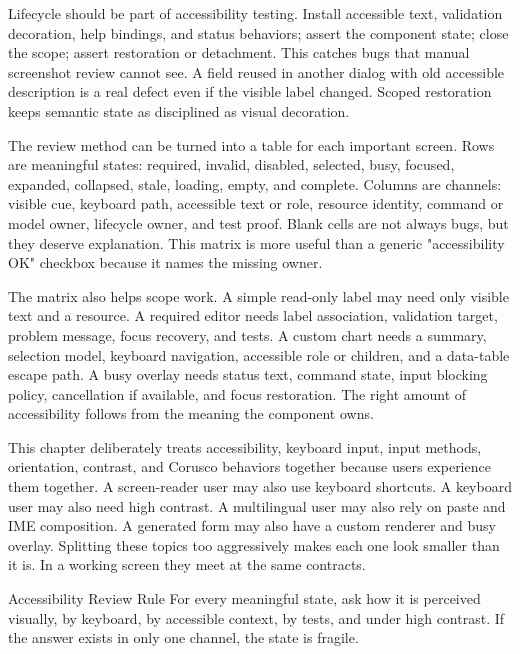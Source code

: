 Lifecycle should be part of accessibility testing. Install accessible text,
validation decoration, help bindings, and status behaviors; assert the component
state; close the scope; assert restoration or detachment. This catches bugs that
manual screenshot review cannot see. A field reused in another dialog with old
accessible description is a real defect even if the visible label changed.
Scoped restoration keeps semantic state as disciplined as visual decoration.

The review method can be turned into a table for each important screen. Rows
are meaningful states: required, invalid, disabled, selected, busy, focused,
expanded, collapsed, stale, loading, empty, and complete. Columns are channels:
visible cue, keyboard path, accessible text or role, resource identity, command
or model owner, lifecycle owner, and test proof. Blank cells are not always
bugs, but they deserve explanation. This matrix is more useful than a generic
"accessibility OK" checkbox because it names the missing owner.

The matrix also helps scope work. A simple read-only label may need only visible
text and a resource. A required editor needs label association, validation
target, problem message, focus recovery, and tests. A custom chart needs a
summary, selection model, keyboard navigation, accessible role or children, and
a data-table escape path. A busy overlay needs status text, command state,
input blocking policy, cancellation if available, and focus restoration. The
right amount of accessibility follows from the meaning the component owns.

This chapter deliberately treats accessibility, keyboard input, input methods,
orientation, contrast, and Corusco behaviors together because users experience
them together. A screen-reader user may also use keyboard shortcuts. A keyboard
user may also need high contrast. A multilingual user may also rely on paste and
IME composition. A generated form may also have a custom renderer and busy
overlay. Splitting these topics too aggressively makes each one look smaller
than it is. In a working screen they meet at the same contracts.

\begin{detailbox}{Accessibility Review Rule}
For every meaningful state, ask how it is perceived visually, by keyboard, by accessible context, by tests, and under high contrast. If the answer exists in only one channel, the state is fragile.
\end{detailbox}

